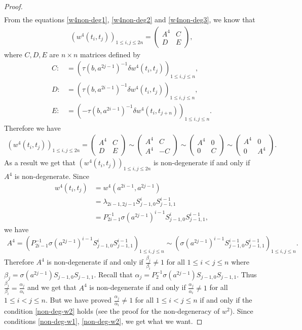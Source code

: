 \documentclass[a4paper,11pt]{amsart}
\numberwithin{equation}{section}
\begin{document}
\begin{proof}
\begin{align}
\end{align}
From the equations \eqref{w4non-deg1}, \eqref{w4non-deg2} and \eqref{w4non-deg3}, we know that
\begin{gather*}
(w^4(t_i,t_j))_{1\leq i,j \leq 2n} = \begin{pmatrix} A^4 & C \\ D & E \end{pmatrix},
\end{gather*}
where $C,D,E$ are $n\times n$ matrices defined by
\begin{align*}
C:&=(\tau(b,a^{2j-1})^{-1} \delta w^4(t_i,t_j))_{1\leq i,j \leq n}, \\
D:&=(\tau(b,a^{2i-1})^{-1} \delta w^4(t_i,t_{j}))_{1\leq i,j \leq n},\\
E:&=(-\tau(b,a^{2i-1})^{-1} \delta w^4(t_i,t_{j+n}))_{1\leq i,j \leq n}.
\end{align*}
Therefore we have
\begin{gather*}
(w^4(t_i,t_j))_{1\leq i,j \leq 2n} = \begin{pmatrix} A^4 & C \\ D & E \end{pmatrix} \sim \begin{pmatrix} A^4 & C \\ A^4 & -C \end{pmatrix} \sim \begin{pmatrix} A^4 & 0 \\ 0 & C \end{pmatrix} \sim \begin{pmatrix} A^4 & 0 \\ 0 & A^4  \end{pmatrix}.
\end{gather*}
As a result we get that $(w^4(t_i,t_j))_{1\leq i,j \leq 2n}$ is non-degenerate
if and only if $A^4$ is non-degenerate. Since
\begin{align*}
w^4(t_i,t_j)&=w^4(a^{2i-1},a^{2j-1})\\
&=\lambda_{2i-1,2j-1} S_{j-1,0}^i S_{j-1,1}^{i-1}\\
&=P_{2i-1}^{-1} \sigma(a^{2j-1})^{i-1} S_{j-1,0}^i S_{j-1,1}^{i-1},
\end{align*}
we have
\begin{gather*}
A^4=(P_{2i-1}^{-1} \sigma(a^{2j-1})^{i-1} S_{j-1,0}^i S_{j-1,1}^{i-1})_{1 \leq i,j \leq n} \sim (\sigma(a^{2j-1})^{i-1} S_{j-1,0}^{i-1} S_{j-1,1}^{i-1})_{1 \leq i,j \leq n}.
\end{gather*}
Therefore $A^4$ is non-degenerate if and only if $\frac{\beta_j}{\beta_i}\neq 1$ for all $1\leq i<j \leq n$ where $\beta_j=\sigma(a^{2j-1}) S_{j-1,0} S_{j-1,1}$. Recall that $\alpha_j=P_{2}^{-1}\sigma(a^{2j-1}) S_{j-1,0} S_{j-1,1}$. Thus $\frac{\beta_j}{\beta_i}=\frac{\alpha_j}{\alpha_i}$ and we get that $A^4$ is non-degenerate if and only if $\frac{\alpha_j}{\alpha_i} \neq 1$ for all $1\leq i<j \leq n$. But we have proved $\frac{\alpha_j}{\alpha_i}\neq 1$ for all $1\leq i<j \leq n$ if and only if the condition \eqref{non-deg-w2} holds (see the proof for the non-degeneracy of $w^2$). Since conditions \ref{non-deg-w1}, \ref{non-deg-w2}, we get what we want.
\end{proof}
\end{document}
